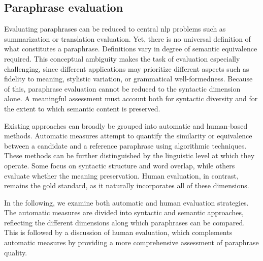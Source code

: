 
\subsection{Paraphrase evaluation}
\label{subsec:paraphrase_evaluation}

Evaluating paraphrases can be reduced to central \ac{nlp} problems such as summarization or translation evaluation.
Yet, there is no universal definition of what constitutes a paraphrase. 
Definitions vary in degree of semantic equivalence required. 
This conceptual ambiguity makes the task of evaluation especially challenging, since different applications may prioritize different aspects such as fidelity to meaning, stylistic variation, or grammatical well-formedness.
Because of this, paraphrase evaluation cannot be reduced to the syntactic dimension alone. 
A meaningful assessment must account both for syntactic diversity and for the extent to which semantic content is preserved. 

Existing approaches can broadly be grouped into automatic and human-based methods. 
Automatic measures attempt to quantify the similarity or equivalence between a candidate and a reference paraphrase using algorithmic techniques. 
These methods can be further distinguished by the linguistic level at which they operate. 
Some focus on syntactic structure and word overlap, while others evaluate whether the meaning preservation. 
Human evaluation, in contrast, remains the gold standard, as it naturally incorporates all of these dimensions.



In the following, we examine both automatic and human evaluation strategies. 
The automatic measures are divided into syntactic and semantic approaches, reflecting the different dimensions along which paraphrases can be compared. 
This is followed by a discussion of human evaluation, which complements automatic measures by providing a more comprehensive assessment of paraphrase quality.


